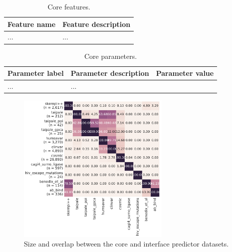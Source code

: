 
\begin{table}[ht]
\caption{Core features.} \label{tab:core_features}
\begin{tabular}{l | p{13cm}}
	\toprule
	Feature name & Feature description \\
	\midrule
	... & ... \\
	\bottomrule
\end{tabular}
\end{table}


\begin{table}[ht]
\caption{Core parameters.} \label{tab:core_parameters}
\begin{tabular}{l | l | l}
	\toprule
	Parameter label & Parameter description & Parameter value \\
	\midrule
	... & ... \\
	\bottomrule
\end{tabular}
\end{table}




\begin{figure}[ht]
	\centering
	\includegraphics[width=0.65\textwidth]{static/elaspic_training_set/data_statistics/training_set_overlap_data_df_interface.pdf}
	\caption{Size and overlap between the core and interface predictor datasets.}
\end{figure}


